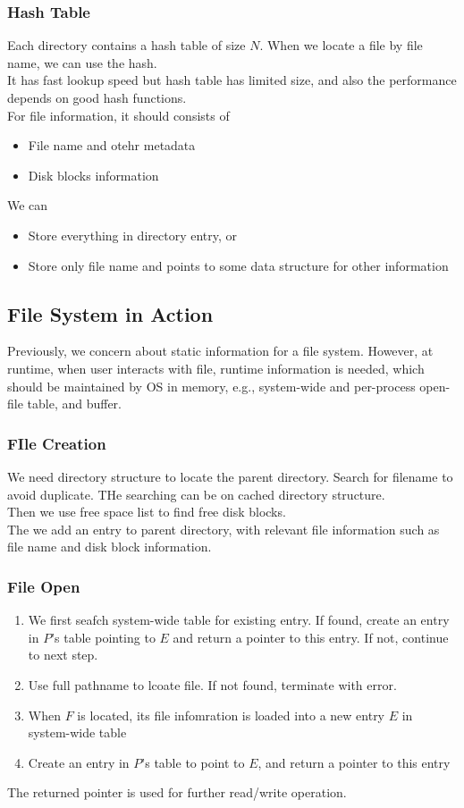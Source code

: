 \documentclass[12pt]{article}
\theoremstyle{definition}
\begin{document}
\subsubsection{Hash Table}
Each directory contains a hash table of size $N$. When we locate a file by file name, we can use the hash.\\
It has fast lookup speed but hash table has limited size, and also the performance depends on good hash functions.
\\
For file information, it should consists of 
\begin{itemize}
  \item File name and otehr metadata
  \item Disk blocks information
\end{itemize}
We can 
\begin{itemize}
  \item Store everything in directory entry, or
  \item Store only file name and points to some data structure for other information
\end{itemize}
\subsection{File System in Action}
Previously, we concern about static information for a file system. However, at runtime, when user interacts with file, runtime information is needed, which should be maintained by OS in memory, e.g., system-wide and per-process open-file table, and buffer.
\subsubsection{FIle Creation}
We need directory structure to locate the parent directory. Search for filename to avoid duplicate. THe searching can be on cached directory structure.\\
Then we use free space list to find free disk blocks.\\
The we add an entry to parent directory, with relevant file information such as file name and disk block information.
\subsubsection{File Open}
\begin{enumerate}
  \item We first seafch system-wide table for existing entry. If found, create an entry in $P$'s table pointing to $E$ and return a pointer to this entry. If not, continue to next step.
  \item Use full pathname to lcoate file. If not found, terminate with error.
  \item When $F$ is located, its file infomration is loaded into a new entry $E$ in system-wide table
  \item Create an entry in $P$'s table to point to $E$, and return a pointer to this entry
\end{enumerate}
The returned pointer is used for further read/write operation.
\end{document}

